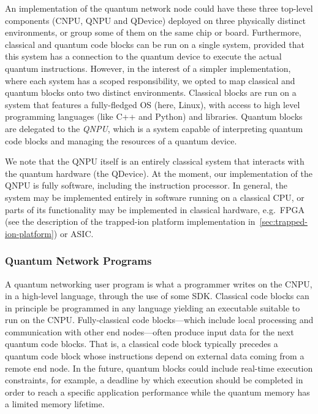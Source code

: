 An implementation of the quantum network node could have these three top-level components (\ac{CNPU}, \ac{QNPU} and \ac{QDevice}) deployed on three physically distinct environments, or group some of them on the same chip or board. Furthermore, classical and quantum code blocks can be run on a single system, provided that this system has a connection to the quantum device to execute the actual quantum instructions. However, in the interest of a simpler implementation, where each system has a scoped responsibility, we opted to map classical and quantum blocks onto two distinct environments. Classical blocks are run on a system that features a fully-fledged \ac{OS} (here, Linux), with access to high level programming languages (like C++ and Python) and libraries. Quantum blocks are delegated to the \emph{\ac{QNPU}}, which is a system capable of interpreting quantum code blocks and managing the resources of a quantum device. 

We note that the \ac{QNPU} itself is an entirely classical system that interacts with the quantum hardware (the \ac{QDevice}). At the moment, our implementation of the \ac{QNPU} is fully software, including the instruction processor. In general, the system may be implemented entirely in software running on a classical \ac{CPU}, or parts of its functionality may be implemented in classical hardware, e.g.~\ac{FPGA} (see the description of the trapped-ion platform implementation in~\cref{sec:trapped-ion-platform}) or \ac{ASIC}.

\subsubsection{Quantum Network Programs}
\label{sec:design:network-application}

A quantum networking user program is what a programmer writes on the \ac{CNPU}, in a high-level language, through the use of some \ac{SDK}. Classical code blocks can in principle be programmed in any language yielding an executable suitable to run on the \ac{CNPU}. Fully-classical code blocks---which include local processing and communication with other end nodes---often produce input data for the next quantum code blocks. That is, a classical code block typically precedes a quantum code block whose instructions depend on external data coming from a remote end node. In the future, quantum blocks could include real-time execution constraints, for example, a deadline by which execution should be completed in order to reach a specific application performance while the quantum memory has a limited memory lifetime.

